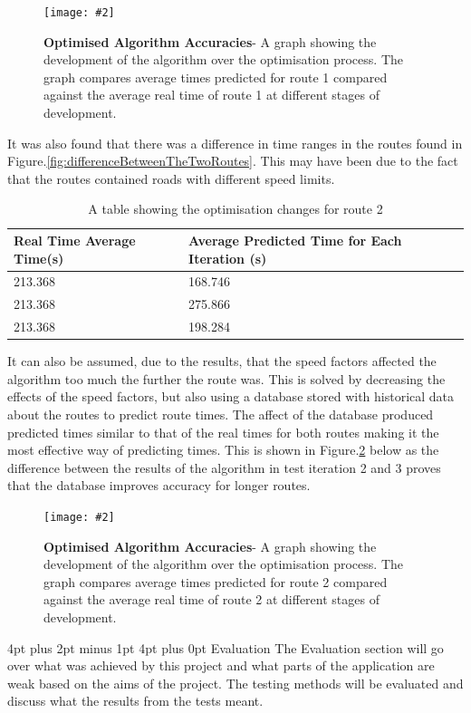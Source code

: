 \documentclass[12pt,a4paper]{article}
\makeatletter
\newcommand{\figuremacro}[5]{
    \begin{figure}[#1]
        \centering
        \texttt{[image: \#2]}
        \caption[#3]{\textbf{#3}#4}
        \label{fig:#2}
    \end{figure}
}
\renewcommand\section{\@startsection {section}{1}{0mm} %
                               {4pt plus 2pt minus 1pt} %
                               {4pt plus 0pt} %
                               {\Large\bfseries}}
\makeatother
\begin{document}
\figuremacro{ht}{graph7}{Optimised Algorithm Accuracies}{- A graph showing the development of the algorithm over the optimisation process. The graph compares average times predicted for route 1 compared against the average real time of route 1 at different stages of development.}{0.8}

\newpage
It was also found that there was a difference in time ranges in the routes found in Figure.\ref{fig:differenceBetweenTheTwoRoutes}. This may have been due to the fact that the routes contained roads with different speed limits. 

\begin{table}[h]
	\caption{A table showing the optimisation changes for route 2}
	\begin{tabular}{@{}ll@{}}
		\toprule
		Real Time Average Time(s) & Average Predicted Time for Each Iteration (s) \\ \midrule
		213.368                   & 168.746                                        \\
		213.368                   & 275.866                                       \\
		213.368                   & 198.284                                       \\ \bottomrule
	\end{tabular}
\end{table}

It can also be assumed, due to the results, that the speed factors affected the algorithm too much the further the route was. This is solved by decreasing the effects of the speed factors, but also using a database stored with historical data about the routes to predict route times. The affect of the database produced predicted times similar to that of the real times for both routes making it the most effective way of predicting times. This is shown in Figure.\ref{fig:graph8} below as the difference between the results of the algorithm in test iteration 2 and 3 proves that the database improves accuracy for longer routes.


\figuremacro{ht}{graph8}{Optimised Algorithm Accuracies}{- A graph showing the development of the algorithm over the optimisation process. The graph compares average times predicted for route 2 compared against the average real time of route 2 at different stages of development.}{0.8} 
\newpage
\section{Evaluation}
The Evaluation section will go over what was achieved by this project and what parts of the application are weak based on the aims of the project. The testing methods will be evaluated and discuss what the results from the tests meant.
\end{document}
